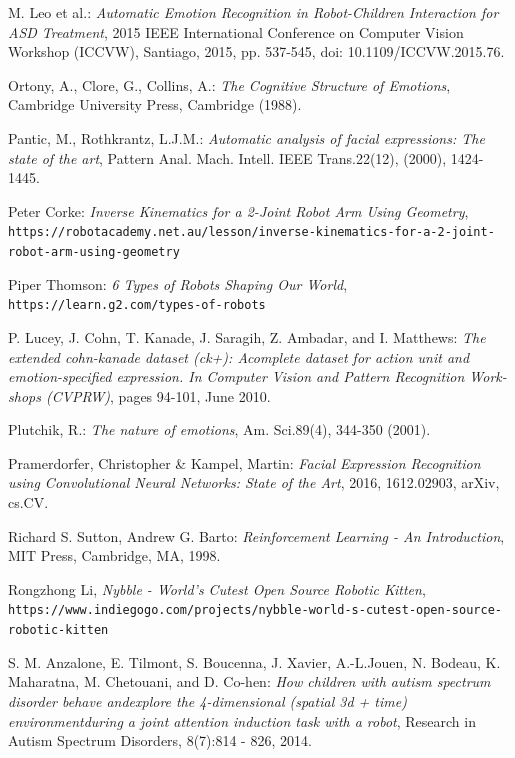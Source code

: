 \documentclass[runningheads,a4paper,12pt]{report}
\begin{document}
\begin{thebibliography}{9}
M. Leo et al.:
\textit{Automatic Emotion Recognition in Robot-Children Interaction for ASD Treatment},
2015 IEEE International Conference on Computer Vision Workshop (ICCVW), Santiago, 2015, pp. 537-545, doi: 10.1109/ICCVW.2015.76.

Ortony, A., Clore, G., Collins, A.: 
\textit{The Cognitive Structure of Emotions}, Cambridge University Press, Cambridge (1988).

Pantic, M., Rothkrantz, L.J.M.: 
\textit{Automatic analysis of facial expressions: The state of the art}, 
Pattern Anal. Mach. Intell. IEEE Trans.22(12), (2000), 1424-1445.

Peter Corke:
\textit{Inverse Kinematics for a 2-Joint Robot Arm Using Geometry},
\texttt{https://robotacademy.net.au/lesson/inverse-kinematics-for-a-2-joint-robot-arm-using-geometry}

Piper Thomson:
\textit{6 Types of Robots Shaping Our World},
\texttt{https://learn.g2.com/types-of-robots}

P. Lucey, J. Cohn, T. Kanade, J. Saragih, Z. Ambadar, and I. Matthews:
\textit{The extended cohn-kanade dataset (ck+): Acomplete dataset for action unit and emotion-specified expression. In Computer Vision and Pattern Recognition Work-shops (CVPRW)}, pages 94-101, June 2010.

Plutchik, R.: 
\textit{The nature of emotions}, 
Am. Sci.89(4), 344-350 (2001).

Pramerdorfer, Christopher \& Kampel, Martin:
\textit{Facial Expression Recognition using Convolutional Neural Networks: State of the Art}, 2016, 1612.02903, arXiv, cs.CV. 

 Richard S. Sutton, Andrew G. Barto:
\textit{Reinforcement Learning - An Introduction},
MIT Press,
Cambridge, MA,
1998.

Rongzhong Li,
\textit{Nybble - World's Cutest Open Source Robotic Kitten},
\texttt{https://www.indiegogo.com/projects/nybble-world-s-cutest-open-source-robotic-kitten}

S. M. Anzalone, E. Tilmont, S. Boucenna, J. Xavier, A.-L.Jouen, N. Bodeau, K. Maharatna, M. Chetouani, and D. Co-hen:
\textit{How children with autism spectrum disorder behave andexplore the 4-dimensional (spatial 3d + time) environmentduring a joint attention induction task with a robot},
Research in Autism Spectrum Disorders, 8(7):814 - 826, 2014.


\end{thebibliography}
\end{document}
